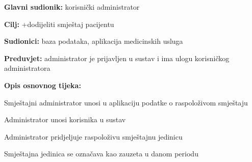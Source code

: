                         \noindent {}
					\begin{packed_item}
	
						\item \textbf{Glavni sudionik: }korisnički administrator
						\item  \textbf{Cilj:} +dodijeliti smještaj pacijentu
						\item  \textbf{Sudionici:} baza podataka, aplikacija medicinskih usluga
						\item  \textbf{Preduvjet:} administrator je prijavljen u sustav i ima ulogu korisničkog administratora
						\item  \textbf{Opis osnovnog tijeka:}
						
						\item[] \begin{packed_enum}
	
							\item Smještajni administrator unosi u aplikaciju podatke o raspoloživom smještaju
                                \item Administrator unosi korisnika u sustav
                                \item Administrator pridjeljuje raspoloživu smještajnu jedinicu
                                \item Smještajna jedinica se označava kao zauzeta u danom periodu
						\end{packed_enum}
						
					\end{packed_item}

